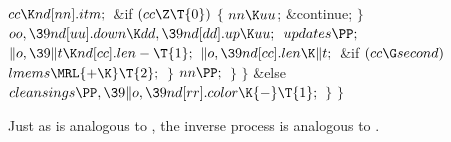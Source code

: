 ${}\\{cc}\K\\{nd}[\\{nn}].\\{itm};{}$\6
\&{if} ${}(\\{cc}\Z\T{0}){}$\5
${}\{{}$\1\6
${}\\{nn}\K\\{uu}{}$;\5
\&{continue};\6
\4${}\}{}$\2\6
${}\\{oo},\39\\{nd}[\\{uu}].\\{down}\K\\{dd},\39\\{nd}[\\{dd}].\\{up}\K%
\\{uu};{}$\6
${}\\{updates}\PP;{}$\6
${}\|o,\39\|t\K\\{nd}[\\{cc}].\\{len}-\T{1};{}$\6
${}\|o,\39\\{nd}[\\{cc}].\\{len}\K\|t;{}$\6
\&{if} ${}(\\{cc}\G\\{second}){}$\1\5
${}\\{lmems}\MRL{+{\K}}\T{2};{}$\2\6
\4${}\}{}$\2\6
${}\\{nn}\PP;{}$\6
\4${}\}{}$\2\6
\4${}\}{}$\5
\2\&{else}\1\5
${}\\{cleansings}\PP,\39\|o,\39\\{nd}[\\{rr}].\\{color}\K{-}\T{1};{}$\2\6
\4${}\}{}$\2\6
\4${}\}{}$\2\par
\fi

Just as  is analogous to , the inverse
process is
analogous to .

